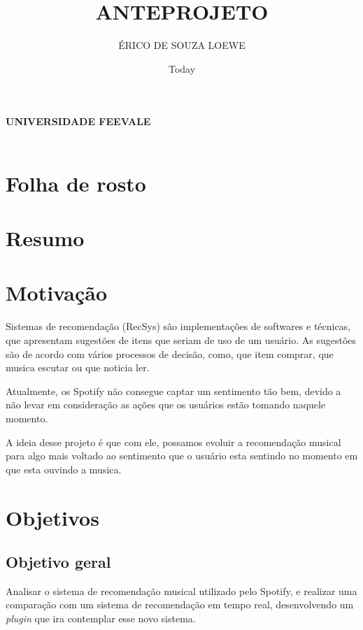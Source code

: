 \documentclass{article}
\title{ANTEPROJETO}
\author{ÉRICO DE SOUZA LOEWE}
\date{Today}
\begin{document}
\makeatletter
\begin{titlepage}
   \begin{center}
      \large\textbf{
      UNIVERSIDADE FEEVALE\\
      \@title\\
      \@author
      }
   \end{center}
\end{titlepage}
\makeatother

\section{Folha de rosto}
\newpage

\section{Resumo}
\newpage

\section{Motivação}

Sistemas de recomendação (RecSys) são implementações de softwares e técnicas, que apresentam sugestões de itens que seriam de uso de um usuário. As sugestões são de acordo com vários processos de decisão, como, que item comprar, que musica escutar ou que noticia ler. \cite{ricci2011introduction}

Atualmente, os Spotify não consegue captar um sentimento tão bem, devido a não levar em consideração as ações que os usuários estão tomando naquele momento. 

A ideia desse projeto é que com ele, possamos evoluir a recomendação musical para algo mais voltado ao sentimento que o usuário esta sentindo no momento em que esta ouvindo a musica.

\newpage

\section{Objetivos}

\subsection{Objetivo geral}

Analisar o sistema de recomendação musical utilizado pelo Spotify, e realizar uma comparação com um sistema de recomendação em tempo real, desenvolvendo um \textit{plugin} que ira contemplar esse novo sistema.
\end{document}
